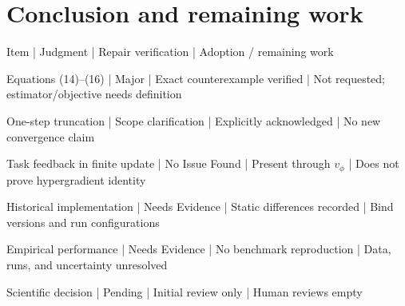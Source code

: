 \documentclass[10pt]{article}
\begin{document}
\section*{Conclusion and remaining work}
Item | Judgment | Repair verification | Adoption / remaining work\par
Equations (14)–(16) | Major | Exact counterexample verified | Not requested; estimator/objective needs definition\par
One-step truncation | Scope clarification | Explicitly acknowledged | No new convergence claim\par
Task feedback in finite update | No Issue Found | Present through \(v_\phi\) | Does not prove hypergradient identity\par
Historical implementation | Needs Evidence | Static differences recorded | Bind versions and run configurations\par
Empirical performance | Needs Evidence | No benchmark reproduction | Data, runs, and uncertainty unresolved\par
Scientific decision | Pending | Initial review only | Human reviews empty\par
\end{document}
